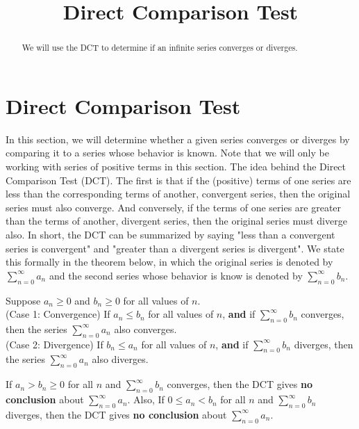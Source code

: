 \documentclass{ximera}
\title{Direct Comparison Test}
\begin{document}
\begin{abstract}
We will use the DCT to determine if an infinite series converges or diverges.
\end{abstract}

\maketitle

\section{Direct Comparison Test}

In this section, we will determine whether a given series converges or diverges by comparing it to a series whose behavior is known.
Note that we will only be working with series of positive terms in this section. The idea behind the Direct Comparison Test (DCT).
The first is that if the (positive) terms of one series are less than the corresponding terms of another, 
convergent series, then the original series must also converge. And conversely, if the terms of one series are greater than 
the terms of another, divergent series, then the original series must diverge also.
In short, the DCT can be summarized by saying "less than a convergent series is convergent" 
and "greater than a divergent series is divergent".
We state this formally in the theorem below, in which the original series is denoted by $\displaystyle{\sum_{n=0}^\infty a_n}$ 
and the second series whose behavior is know is denoted by $\displaystyle{\sum_{n=0}^\infty b_n}$.


\begin{theorem}
 Suppose $a_n \geq 0$ and $b_n \geq 0$ for all values of $n$.\\
(Case 1: Convergence) If $a_n \leq b_n$ for all values of $n$, \textbf{and} if $\displaystyle{\sum_{n=0}^\infty b_n}$ converges, 
then the series $\displaystyle{\sum_{n=0}^\infty a_n}$ also converges.\\
(Case 2: Divergence) If $b_n \leq a_n$ for all values of $n$, \textbf{and} if $\displaystyle{\sum_{n=0}^\infty b_n}$ diverges, 
then the series $\displaystyle{\sum_{n=0}^\infty a_n}$ also diverges.
\end{theorem}


\begin{remark}
If $a_n > b_n \geq 0$ for all $n$ and $\displaystyle{\sum_{n=0}^\infty b_n}$ converges, then the DCT gives \textbf{no conclusion} about $\displaystyle{\sum_{n=0}^\infty a_n}$.
Also, If $0 \leq a_n < b_n$ for all $n$ and $\displaystyle{\sum_{n=0}^\infty b_n}$ diverges, then the DCT gives \textbf{no conclusion} about $\displaystyle{\sum_{n=0}^\infty a_n}$.
\end{remark}
\end{document}
